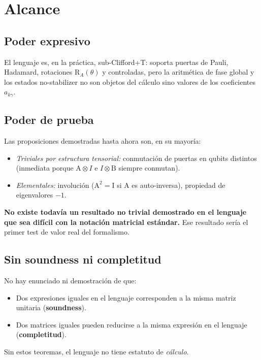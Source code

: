 \documentclass[12pt, a4paper]{article}
\newcommand{\gate}[1]{\text{#1}}
\newcommand{\con}[1]{\textit{#1}}
\begin{document}
\section{Alcance}

\subsection{Poder expresivo}

El lenguaje es, en la práctica, sub-Clifford+T: soporta puertas de Pauli,
Hadamard, rotaciones $\gate{R}_A(\theta)$ y controladas, pero la aritmética de
fase global y los estados no-stabilizer no son objetos del cálculo sino valores
de los coeficientes $a_{k\gamma}$.

\subsection{Poder de prueba}

Las proposiciones demostradas hasta ahora son, en su mayoría:
\begin{itemize}
  \item \con{Triviales por estructura tensorial:} conmutación de puertas en
        qubits distintos (inmediata porque $\gate{A} \otimes I$ e $I \otimes \gate{B}$
        siempre conmutan).
  \item \con{Elementales:} involución ($\gate{A}^2 = \gate{I}$ si $\gate{A}$
        es auto-inversa), propiedad de eigenvalores $-1$.
\end{itemize}

\textbf{No existe todavía un resultado no trivial demostrado en el lenguaje
  que sea difícil con la notación matricial estándar.}
Ese resultado sería el primer test de valor real del formalismo.

\subsection{Sin soundness ni completitud}

No hay enunciado ni demostración de que:
\begin{itemize}
  \item Dos expresiones iguales en el lenguaje corresponden a la misma
        matriz unitaria (\textbf{soundness}).
  \item Dos matrices iguales pueden reducirse a la misma expresión en el
        lenguaje (\textbf{completitud}).
\end{itemize}
Sin estos teoremas, el lenguaje no tiene estatuto de \emph{cálculo}.
\end{document}
